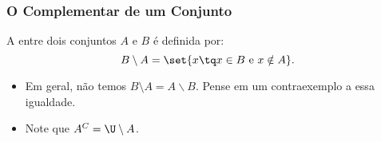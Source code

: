 \begin{frame}
\frametitle{O Complementar de um Conjunto} %

\begin{definicao}
A  entre dois conjuntos $A$ e $B$ é definida por:
$$ B \setminus A = \set {x \tq x \in B \text { e } x \notin A}.$$
\end{definicao}

\begin{itemize}
	\item Em geral, não temos $B \setminus A = A \backslash B$. Pense em um contraexemplo a essa
	igualdade.
	\item Note que $A^C = \U \setminus A$.
\end{itemize}

\end{frame}